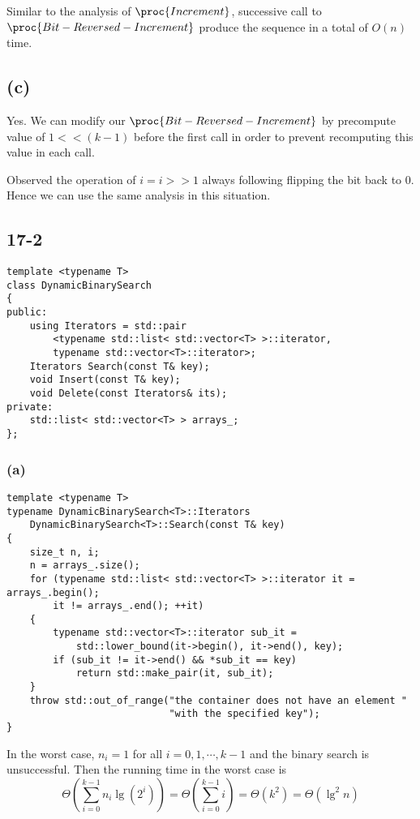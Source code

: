 Similar to the analysis of $\proc{Increment}$,
successive call to $\proc{Bit-Reversed-Increment}$
produce the sequence in a total of $O(n)$ time.

\subsection*{(c)}

Yes.
We can modify our $\proc{Bit-Reversed-Increment}$
by precompute value of $1 << (k - 1)$ before the first call
in order to prevent recomputing this value in each call. 

Observed the operation of $i = i >> 1$ always following 
flipping the bit back to $0$.
Hence we can use the same analysis in this situation.

\subsection*{17-2}

\begin{verbatim}
template <typename T>
class DynamicBinarySearch
{
public:
    using Iterators = std::pair
        <typename std::list< std::vector<T> >::iterator, 
        typename std::vector<T>::iterator>;
    Iterators Search(const T& key);
    void Insert(const T& key);
    void Delete(const Iterators& its);
private:
    std::list< std::vector<T> > arrays_;
};
\end{verbatim}
    
\subsubsection*{(a)}

\begin{verbatim}
template <typename T>
typename DynamicBinarySearch<T>::Iterators 
    DynamicBinarySearch<T>::Search(const T& key)
{
    size_t n, i;
    n = arrays_.size();
    for (typename std::list< std::vector<T> >::iterator it = arrays_.begin(); 
        it != arrays_.end(); ++it)
    {
        typename std::vector<T>::iterator sub_it = 
            std::lower_bound(it->begin(), it->end(), key);
        if (sub_it != it->end() && *sub_it == key)
            return std::make_pair(it, sub_it);
    }
    throw std::out_of_range("the container does not have an element "
                            "with the specified key");
}
\end{verbatim}

In the worst case, $n_i = 1$ for all $i = 0, 1, \cdots, k - 1$
and the binary search is unsuccessful.
Then the running time in the worst case is 
\begin{equation*}
    \Theta(\sum\limits_{i = 0}^{k - 1} n_i \lg(2^i))
    = \Theta(\sum\limits_{i = 0}^{k - 1} i)
    = \Theta(k^2)
    = \Theta(\lg^2 n)
\end{equation*}

